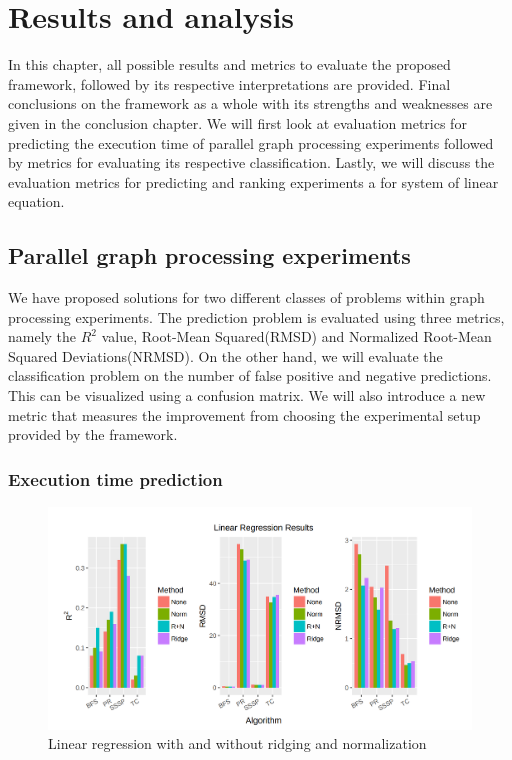 \usepackage{siunitx}

\chapter{Results and analysis} 
In this chapter, all possible results and metrics to evaluate the proposed framework, followed by its respective interpretations are provided. Final conclusions on the framework as a whole with its strengths and weaknesses are given in the conclusion chapter.  We will first look at evaluation metrics for predicting the execution time of parallel graph processing experiments followed by metrics for evaluating its respective classification. Lastly, we will discuss the evaluation metrics for predicting and ranking experiments a for system of linear equation. 
\section{Parallel graph processing experiments}
We have proposed solutions for two different classes of problems within graph processing experiments. The prediction problem is evaluated using three metrics, namely the $R^2$ value, Root-Mean Squared(RMSD) and Normalized Root-Mean Squared Deviations(NRMSD).
On the other hand, we will evaluate the classification problem on the number of false positive and negative predictions. This can be visualized using a confusion matrix. We will also introduce a new metric that measures the improvement from choosing the experimental setup provided by the framework.

\subsection{Execution time prediction}

\begin{figure}
    \centering
    \includegraphics[width=1\columnwidth]{figures/regression_results.png}
    \caption{Linear regression with and without ridging and normalization}
    \label{Linear regression with and without ridging and normalization}
\end{figure}

